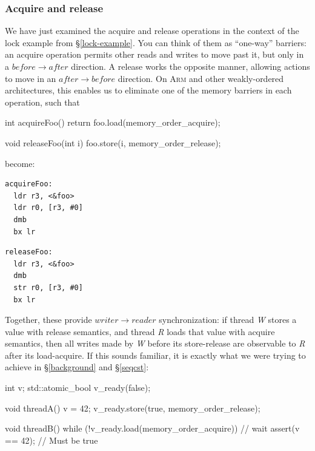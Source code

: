 \documentclass[fontsize=10pt, oneside]{scrartcl}
\newcommand{\secref}[1]{\hyperref[#1]{\textsc{\S}\ref*{#1}}}
\begin{document}
\subsubsection{Acquire and release}

We have just examined the acquire and release operations in the context of the lock example from \secref{lock-example}.
You can think of them as ``one-way'' barriers: an acquire operation permits other reads and writes to move past it,
but only in a $before \to after$ direction.
A release works the opposite manner, allowing actions to move in an $after \to before$ direction.
On \textsc{Arm} and other weakly-ordered architectures, this enables us to eliminate one of the memory barriers in each operation,
such that

\begin{cppcode}
int acquireFoo()
{
    return foo.load(memory_order_acquire);
}

void releaseFoo(int i)
{
    foo.store(i, memory_order_release);
}
\end{cppcode}
become:
\begin{minipage}{0.45\linewidth}
\begin{lstlisting}[language={[ARM]Assembler}]
acquireFoo:
  ldr r3, <&foo>
  ldr r0, [r3, #0]
  dmb
  bx lr
\end{lstlisting}
\end{minipage}
\begin{minipage}{0.45\linewidth}
\begin{lstlisting}[language={[ARM]Assembler}]
releaseFoo:
  ldr r3, <&foo>
  dmb
  str r0, [r3, #0]
  bx lr
\end{lstlisting}
\end{minipage}

Together, these provide $writer \to reader$ synchronization:
if thread \textit{W} stores a value with release semantics,
and thread \textit{R} loads that value with acquire semantics,
then all writes made by \textit{W} before its store-release are observable to \textit{R} after its load-acquire.
If this sounds familiar, it is exactly what we were trying to achieve in
\secref{background} and \secref{seqcst}:
\begin{cppcode}
int v;
std::atomic_bool v_ready(false);

void threadA()
{
    v = 42;
    v_ready.store(true, memory_order_release);
}

void threadB()
{
    while (!v_ready.load(memory_order_acquire)) {
        // wait
    }
    assert(v == 42); // Must be true
}
\end{cppcode}
\end{document}
